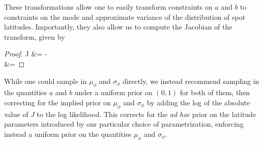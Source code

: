 \documentclass[modern]{aastex62}
\begin{document}
These transformations allow one to easily transform constraints on $a$ and
$b$ to constraints on the mode and approximate variance of the distribution
of spot latitudes. Importantly, they also allow us to compute the Jacobian
of the transform, given by
%
\begin{proof}{}
    J &=
     -
    \\
    &=
    \nonumber
\end{proof}
%
While one could sample in $\mu_\phi$ and $\sigma_\phi$ directly, we instead
recommend sampling in the quantities $a$ and $b$ under a uniform prior on
$(0, 1)$ for both of them, then correcting for the implied prior on
$\mu_\phi$ and $\sigma_\phi$ by adding the log of the absolute value of $J$ to the log
likelihood. This corrects for the \emph{ad hoc}
prior on the latitude parameters introduced by our particular choice of
parametrization, enforcing instead a uniform prior on the quantities $\mu_\phi$
and $\sigma_\phi$.
\end{document}
